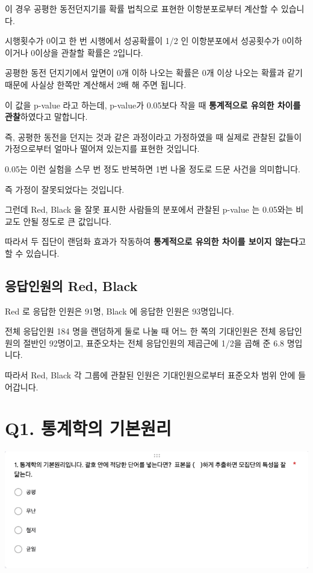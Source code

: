 \documentclass[
]{book}
\begin{document}
이 경우 공평한 동전던지기를 확률 법칙으로 표현한 이항분포로부터 계산할 수 있습니다.

시행횟수가 0이고 한 번 시행에서 성공확률이 1/2 인 이항분포에서 성공횟수가 0이하이거나 0이상을 관찰할 확률은 2입니다.

공평한 동전 던지기에서 앞면이 0개 이하 나오는 확률은 0개 이상 나오는 확률과 같기 때문에 사실상 한쪽만 계산해서 2배 해 주면 됩니다.

이 값을 p-value 라고 하는데, p-value가 0.05보다 작을 때 \textbf{통계적으로 유의한 차이를 관찰}하였다고 말합니다.

즉, 공평한 동전을 던지는 것과 같은 과정이라고 가정하였을 때 실제로 관찰된 값들이 가정으로부터 얼마나 떨어져 있는지를 표현한 것입니다.

0.05는 이런 실험을 스무 번 정도 반복하면 1번 나올 정도로 드문 사건을 의미합니다.

즉 가정이 잘못되었다는 것입니다.

그런데 Red, Black 을 잘못 표시한 사람들의 분포에서 관찰된 p-value 는 0.05와는 비교도 안될 정도로 큰 값입니다.

따라서 두 집단이 랜덤화 효과가 작동하여 \textbf{통계적으로 유의한 차이를 보이지 않는다}고 할 수 있습니다.

\subsection{응답인원의 Red, Black}\label{uxc751uxb2f5uxc778uxc6d0uxc758-red-black-6}

Red 로 응답한 인원은 91명, Black 에 응답한 인원은 93명입니다.

전체 응답인원 184 명을 랜덤하게 둘로 나눌 때 어느 한 쪽의 기대인원은 전체 응답인원의 절반인 92명이고, 표준오차는 전체 응답인원의 제곱근에 1/2을 곱해 준 6.8 명입니다.

따라서 Red, Black 각 그룹에 관찰된 인원은 기대인원으로부터 표준오차 범위 안에 들어갑니다.

\section{Q1. 통계학의 기본원리}\label{q1.-uxd1b5uxacc4uxd559uxc758-uxae30uxbcf8uxc6d0uxb9ac}

\begin{flushleft}\includegraphics[width=0.75\linewidth]{./pics/Quiz210406_Q1} \end{flushleft}
\end{document}
